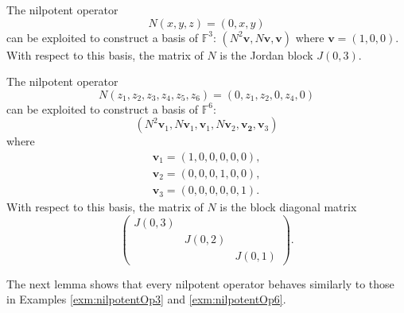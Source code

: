\begin{exm}
  \label{exm:nilpotentOp3}
  The nilpotent operator %
  \begin{displaymath}
    N(x,y,z) = (0, x, y)
  \end{displaymath}
  can be exploited to construct a basis of $\mathbb{F}^3$:
  $(N^2 \mathbf{v}, N\mathbf{v}, \mathbf{v})$
  where $\mathbf{v}=(1,0,0)$.
  With respect to this basis,
  the matrix of $N$ is the Jordan block $J(0,3)$.
\end{exm}

\begin{exm}
  \label{exm:nilpotentOp6}
  The nilpotent operator %
  \begin{displaymath}
    N(z_1,z_2,z_3,z_4,z_5,z_6) = (0, z_1, z_2, 0, z_4, 0)
  \end{displaymath}
  can be exploited to construct a basis of $\mathbb{F}^6$:
  \begin{displaymath}
    (N^2 \mathbf{v}_1, N\mathbf{v}_1, \mathbf{v}_1, N\mathbf{v}_2,
    \mathbf{v_2}, \mathbf{v}_3)
  \end{displaymath}
  where
  \begin{displaymath}
    \begin{array}{l}
    \mathbf{v}_1=(1,0,0,0,0,0),\\
      \mathbf{v}_2=(0,0,0,1,0,0),\\
      \mathbf{v}_3=(0,0,0,0,0,1).
    \end{array}
  \end{displaymath}
  With respect to this basis,
  the matrix of $N$ is the block diagonal matrix
  \begin{displaymath}
    \begin{pmatrix}
      J(0,3) & & \\
      & J(0,2) & \\
      & & J(0,1) 
    \end{pmatrix}.
  \end{displaymath}
\end{exm}

\begin{rem}
  The next lemma shows that every nilpotent operator
  behaves similarly to those
  in Examples \ref{exm:nilpotentOp3} and \ref{exm:nilpotentOp6}.
\end{rem}

